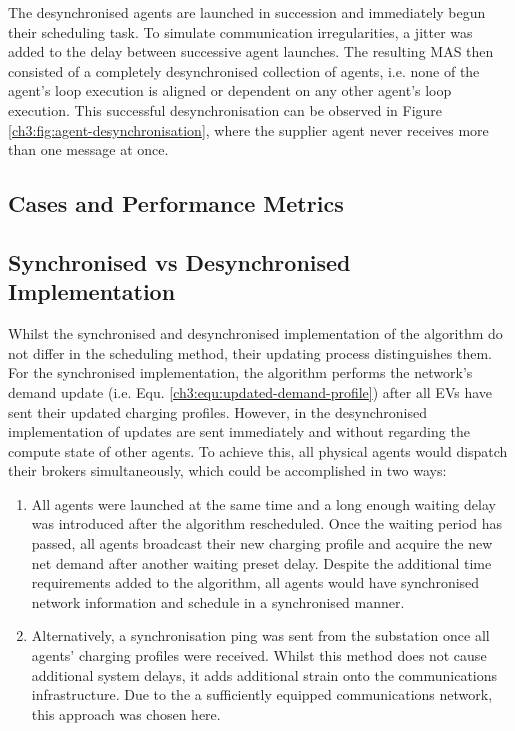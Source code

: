 The desynchronised agents are launched in succession and immediately begun their scheduling task.
To simulate communication irregularities, a jitter was added to the delay between successive agent launches.
The resulting MAS then consisted of a completely desynchronised collection of agents, i.e. none of the agent's loop execution is aligned or dependent on any other agent's loop execution.
This successful desynchronisation can be observed in Figure \ref{ch3:fig:agent-desynchronisation}, where the supplier agent never receives more than one message at once.



\subsection{Cases and Performance Metrics}
\label{ch3:subsec:cases-and-metrics}

\subsection{Synchronised vs Desynchronised Implementation}

Whilst the synchronised and desynchronised implementation of the algorithm do not differ in the scheduling method, their updating process distinguishes them.
For the synchronised implementation, the algorithm performs the network's demand update (i.e. Equ. \ref{ch3:equ:updated-demand-profile}) after all EVs have sent their updated charging profiles.
However, in the desynchronised implementation of updates are sent immediately and without regarding the compute state of other agents.
To achieve this, all physical agents would dispatch their brokers simultaneously, which could be accomplished in two ways:

\begin{enumerate}
	\item All agents were launched at the same time and a long enough waiting delay was introduced after the algorithm rescheduled. Once the waiting period has passed, all agents broadcast their new charging profile and acquire the new net demand after another waiting preset delay. Despite the additional time requirements added to the algorithm, all agents would have synchronised network information and schedule in a synchronised manner.
	\item Alternatively, a synchronisation ping was sent from the substation once all agents' charging profiles were received. Whilst this method does not cause additional system delays, it adds additional strain onto the communications infrastructure. Due to the a sufficiently equipped communications network, this approach was chosen here.
\end{enumerate}

